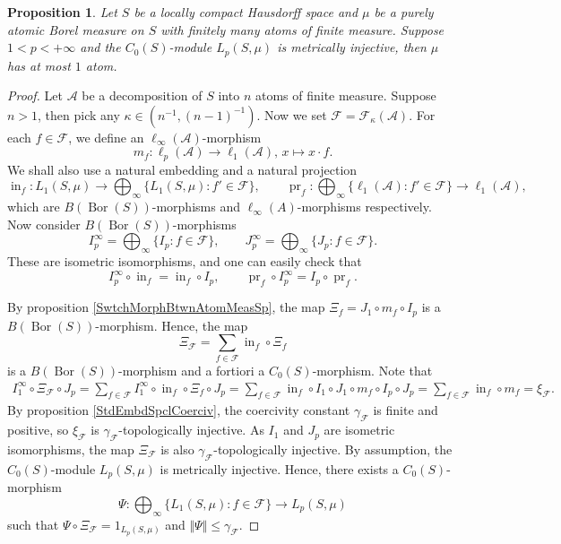\documentclass[12pt]{article}
\newtheorem{proposition}[theorem]{Proposition}
\begin{document}
\begin{proposition}\label{MetInjC0SModLpSmuOnFinAtmMeasSpCharac}
    Let $S$ be a locally compact Hausdorff space and $\mu$ be a purely atomic 
    Borel measure on $S$ with finitely many atoms of finite measure. 
    Suppose $1<p<+\infty$ and the $C_0(S)$-module $L_p(S,\mu)$ is metrically 
    injective, then $\mu$ has at most $1$ atom.
\end{proposition}
\begin{proof}
    Let $\mathcal{A}$ be a decomposition of $S$ into $n$ atoms of finite 
    measure. Suppose $n>1$, then pick any $\kappa\in(n^{-1}, (n-1)^{-1})$. 
    Now we set $\mathcal{F}=\mathcal{F}_{\kappa}(\mathcal{A})$. For 
    each $f\in \mathcal{F}$, we define an $\ell_\infty(\mathcal{A})$-morphism 
    \[
        m_f:
        \ell_p(\mathcal{A})\to\ell_1(\mathcal{A}),\,
        x\mapsto x\cdot f.
    \]
    We shall also use a natural embedding and a natural projection
    \[
        \operatorname{in}_f:
        L_1(S,\mu)\to\bigoplus_\infty\{L_1(S,\mu):f'\in\mathcal{F}\},
        \qquad
        \operatorname{pr}_f:
        \bigoplus_\infty\{
            \ell_1(\mathcal{A}):f'\in\mathcal{F}
        \}\to\ell_1(\mathcal{A}),
    \]
    which are $B(\operatorname{Bor}(S))$-morphisms 
    and $\ell_\infty(A)$-morphisms respectively. 
    Now consider $B(\operatorname{Bor}(S))$-morphisms 
    \[
        I_p^\infty=\bigoplus_\infty\{I_p:f\in\mathcal{F}\},
        \qquad
        J_p^\infty=\bigoplus_\infty\{J_p:f\in\mathcal{F}\}.
    \]
    These are isometric isomorphisms, and one can easily check that 
    \[
        I_p^\infty \circ \operatorname{in}_f=\operatorname{in}_f\circ I_p,
        \qquad 
        \operatorname{pr}_f\circ I_p^\infty=I_p\circ \operatorname{pr}_f.
    \]

    By proposition \ref{SwtchMorphBtwnAtomMeasSp}, the 
    map $\Xi_f=J_1\circ m_f\circ I_p$ is 
    a $B(\operatorname{Bor}(S))$-morphism. Hence, the map 
    \[
        \Xi_{\mathcal{F}}=\sum_{f\in\mathcal{F}}\operatorname{in}_f\circ \Xi_f
    \]
    is a $B(\operatorname{Bor}(S))$-morphism and a fortiori a $C_0(S)$-morphism. 
    Note that
    \[
    \begin{aligned}
        I_1^\infty\circ\Xi_\mathcal{F}\circ J_p
        = \sum_{f\in\mathcal{F}} 
            I_1^\infty\circ\operatorname{in}_f \circ \Xi_f \circ J_p
        = \sum_{f\in\mathcal{F}} 
            \operatorname{in}_f\circ I_1 \circ 
            J_1 \circ m_f \circ I_p \circ J_p
        =\sum_{f\in\mathcal{F}} \operatorname{in}_f\circ m_f 
        =\xi_{\mathcal{F}}.
    \end{aligned}
    \]
    By proposition \ref{StdEmbdSpclCoerciv}, the coercivity 
    constant $\gamma_{\mathcal{F}}$ is finite and positive, 
    so $\xi_{\mathcal{F}}$ is $\gamma_{\mathcal{F}}$-topologically injective.
    As $I_1$ and $J_p$ are isometric isomorphisms, the map $\Xi_{\mathcal{F}}$ is
    also $\gamma_{\mathcal{F}}$-topologically injective. By assumption, 
    the $C_0(S)$-module $L_p(S,\mu)$ is metrically injective. Hence, there 
    exists a $C_0(S)$-morphism 
    \[
        \Psi:
        \bigoplus_\infty\{ L_1(S,\mu):f\in\mathcal{F}\}\to L_p(S,\mu)
    \]
    such that $\Psi\circ \Xi_{\mathcal{F}}=1_{L_p(S,\mu)}$ 
    and $\Vert \Psi\Vert\leq \gamma_{\mathcal{F}}$.


\end{proof}
\end{document}
